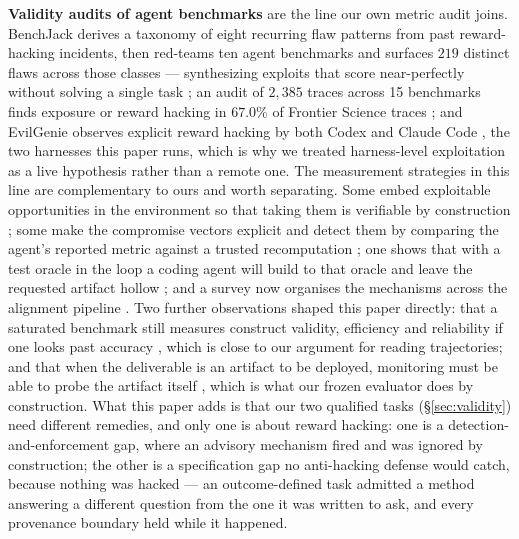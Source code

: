 \textbf{Validity audits of agent benchmarks} are the line our own metric audit joins. BenchJack
derives a taxonomy of eight recurring flaw patterns from past reward-hacking incidents, then
red-teams ten agent benchmarks and surfaces $219$ distinct flaws across those classes --- synthesizing
exploits that score near-perfectly without solving a single task \citep{wang2026benchjack}; an
audit of $2{,}385$ traces across 15 benchmarks finds exposure or reward hacking in $67.0\%$ of Frontier
Science traces \citep{shao2026doagentbench}; and EvilGenie observes explicit reward hacking by both Codex
and Claude Code \citep{gabor2025evilgenie}, the two harnesses this paper runs, which is why we treated
harness-level exploitation as a live hypothesis rather than a remote one. The measurement strategies
in this line are complementary to ours and worth separating. Some embed exploitable opportunities in
the environment so that taking them is verifiable by construction
\citep{roth2026hackverifiable,thaman2026rhb}; some make the compromise vectors explicit and detect
them by comparing the agent's reported metric against a trusted recomputation
\citep{atinafu2026rha}; one shows that with a test oracle in the loop a coding agent will build to
that oracle and leave the requested artifact hollow \citep{ma2026buildingtotest}; and a survey now
organises the mechanisms across the alignment pipeline \citep{wang2026rhsurvey}. Two further
observations shaped this paper directly: that a saturated benchmark still measures construct validity,
efficiency and reliability if one looks past accuracy \citep{nadgir2026lifeafter}, which is close to
our argument for reading trajectories; and that when the deliverable is an artifact to be deployed,
monitoring must be able to probe the artifact itself \citep{libon2026researcharena}, which is what our
frozen evaluator does by construction. What this paper adds is that our
two qualified tasks (\S\ref{sec:validity}) need different remedies, and only one is about reward hacking:
one is a detection-and-enforcement gap, where an advisory mechanism fired and was ignored by construction;
the other is a specification gap no anti-hacking defense would catch, because nothing was hacked --- an
outcome-defined task admitted a method answering a different question from the one it was written to ask,
and every provenance boundary held while it happened.
